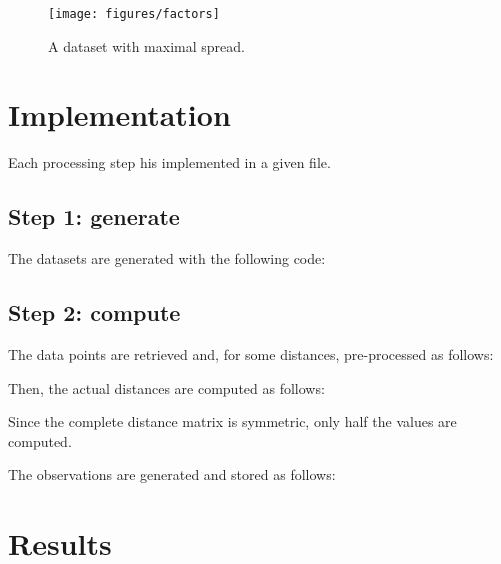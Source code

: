 \documentclass[12pt,a4paper,fleqn]{tufte-handout}
\begin{document}
\begin{figure}
\texttt{[image: figures/factors]}
\caption{A dataset with maximal spread.}
\label{scatter}
\end{figure}

\section{Implementation}

Each processing step his implemented in a given file.

\subsection{Step 1: generate}

The datasets are generated with the following code:


\subsection{Step 2: compute} 


The data points are retrieved and, for some distances, pre-processed as follows:
 

Then, the actual distances are computed as follows:
 
Since the complete distance matrix is symmetric, only half the values are computed.

The observations are generated and stored as follows:
   

\section{Results}

  
  
  
% 
% 
  
\end{document}
